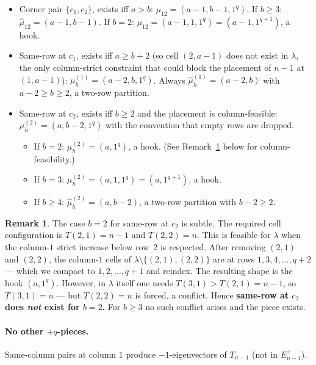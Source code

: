 \documentclass[11pt]{article}
\theoremstyle{definition}
\newtheorem{remark}[theorem]{Remark}
\newcommand{\hatm}{\widehat\mu}
\begin{document}
\begin{itemize}[topsep=0.2em,itemsep=0.1em]
\item Corner pair $\{c_1, c_2\}$, exists iff $a > b$:
   $\mu_{12} = (a-1, b-1, 1^q)$.  If $b \ge 3$:
   $\hatm_{12} = (a-1, b-1)$.  If $b = 2$:
   $\mu_{12} = (a-1, 1, 1^q) = (a-1, 1^{q+1})$, a hook.
\item Same-row at $c_1$, exists iff $a \ge b + 2$ (so cell $(2, a-1)$
   does not exist in $\lambda$, the only column-strict constraint that
   could block the placement of $n-1$ at $(1, a-1)$):
   $\mu_h^{(1)} = (a-2, b, 1^q)$.  Always $\hatm_h^{(1)} = (a-2, b)$
   with $a - 2 \ge b \ge 2$, a two-row partition.
\item Same-row at $c_2$, exists iff $b \ge 2$ and the placement is
   column-feasible:
   $\mu_h^{(2)} = (a, b-2, 1^q)$ with the convention that empty rows
   are dropped.
   \begin{itemize}[topsep=0.2em,itemsep=0.1em]
   \item If $b = 2$: $\mu_h^{(2)} = (a, 1^q)$, a hook.  (See
      Remark~\ref{rem:b2-c2} below for column-feasibility.)
   \item If $b = 3$: $\mu_h^{(2)} = (a, 1, 1^q) = (a, 1^{q+1})$, a hook.
   \item If $b \ge 4$: $\hatm_h^{(2)} = (a, b-2)$, a two-row partition
      with $b - 2 \ge 2$.
   \end{itemize}
\end{itemize}

\begin{remark}\label{rem:b2-c2}
The case $b = 2$ for same-row at $c_2$ is subtle.  The required cell
configuration is $T(2, 1) = n-1$ and $T(2, 2) = n$.  This is feasible
for $\lambda$ when the column-$1$ strict increase below row~2 is
respected.  After removing $(2, 1)$ and $(2, 2)$, the column-$1$
cells of $\lambda \setminus \{(2,1), (2,2)\}$ are at rows
$1, 3, 4, \ldots, q+2$ --- which we compact to $1, 2, \ldots, q+1$
and reindex.  The resulting shape is the hook $(a, 1^q)$.  However,
in $\lambda$ itself one needs $T(3, 1) > T(2, 1) = n - 1$, so
$T(3, 1) = n$ --- but $T(2, 2) = n$ is forced, a conflict.  Hence
\textbf{same-row at $c_2$ does \emph{not} exist for $b = 2$.}  For
$b \ge 3$ no such conflict arises and the piece exists.
\end{remark}

\paragraph{No other $+q$-pieces.}  Same-column pairs at column $1$
produce $-1$-eigenvectors of $T_{n-1}$ (not in $E_{n-1}^+$).
\end{document}
